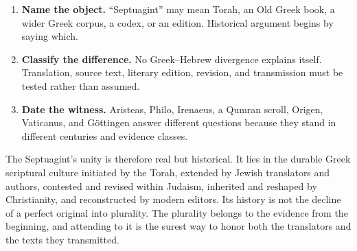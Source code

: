\begin{enumerate}
\item \textbf{Name the object.} “Septuagint” may mean Torah, an Old Greek book, a wider Greek corpus, a codex, or an edition. Historical argument begins by saying which.
\item \textbf{Classify the difference.} No Greek--Hebrew divergence explains itself. Translation, source text, literary edition, revision, and transmission must be tested rather than assumed.
\item \textbf{Date the witness.} Aristeas, Philo, Irenaeus, a Qumran scroll, Origen, Vaticanus, and G\"ottingen answer different questions because they stand in different centuries and evidence classes.
\end{enumerate}

The Septuagint's unity is therefore real but historical. It lies in the durable Greek scriptural culture initiated by the Torah, extended by Jewish translators and authors, contested and revised within Judaism, inherited and reshaped by Christianity, and reconstructed by modern editors. Its history is not the decline of a perfect original into plurality. The plurality belongs to the evidence from the beginning, and attending to it is the surest way to honor both the translators and the texts they transmitted.
